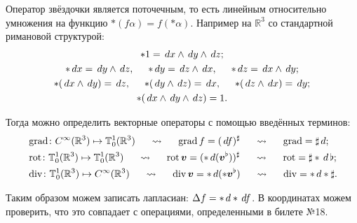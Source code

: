 Оператор звёздочки является поточечным, то есть линейным относительно умножения на функцию $*(f \alpha) = f(*\alpha)$. Например на $\mathbb{R}^3$ со стандартной римановой структурой:
\begin{gather*}
   	*1 = \, d x \wedge \, d y \wedge \, d z;
   	\\
   	*\, d x = \, d y \wedge \, d z, 
   	\hspace*{0.5 cm}
   	*\, d y = \, d z \wedge \, d x, 
   	\hspace*{0.5 cm}
   	*\, d z = \, d x \wedge \, d y;
   	\\
   	*(\, d x \wedge \, d y) = \, d z,
   	\hspace*{0.5 cm}
   	*(\, d y \wedge \, d z) = \, d x,
   	\hspace*{0.5 cm}
   	*(\, d z \wedge \, d x) = \, d y;
   	\\
   	*(\, d x \wedge \, d y \wedge \, d z) = 1.
\end{gather*}

Тогда можно определить векторные операторы с помощью введённых терминов:
\begin{align*}
   &\mathop{\mathrm{grad}}\nolimits \colon C^\infty(\mathbb{R}^3) \mapsto \mathbb{T}_0^1 (\mathbb{R}^3)
   \hspace*{0.5 cm} 
   \leadsto 
   \hspace*{0.5 cm}
   \mathop{\mathrm{grad}}\nolimits f = (\, d f)^\sharp 
   \hspace*{0.5 cm} 
   \leadsto 
   \hspace*{0.5 cm}
   \mathop{\mathrm{grad}}\nolimits = \sharp \, d;
   \\
   &\mathop{\mathrm{rot}}\nolimits \colon \mathbb{T}_0^1(\mathbb{R}^3) \mapsto \mathbb{T}_0^1(\mathbb{R}^3)
   \hspace*{0.5 cm} 
   \leadsto 
   \hspace*{0.5 cm}
   \mathop{\mathrm{rot}}\nolimits \mbox{\boldmath $v$} = (*\, d(\mbox{\boldmath $v$}^\flat))^\sharp
   \hspace*{0.5 cm} 
   \leadsto 
   \hspace*{0.5 cm}
   \mathop{\mathrm{rot}}\nolimits = \sharp * \, d \, \flat;
   \\
   &\mathop{\mathrm{div}}\nolimits \colon \mathbb{T}_0^1(\mathbb{R}^3) \mapsto C^\infty(\mathbb{R}^3)
   \hspace*{0.5 cm} 
   \leadsto 
   \hspace*{0.5 cm}
   \mathop{\mathrm{div}}\nolimits \mbox{\boldmath $v$} = *\, d(*\mbox{\boldmath $v$}^\flat)
   \hspace*{0.5 cm} 
   \leadsto 
   \hspace*{0.5 cm}
   \mathop{\mathrm{div}}\nolimits = * \, d * \sharp.
\end{align*}

Таким образом можем записать лапласиан: $\Delta f = *\, d * \, d f$. В координатах можем проверить, что это совпадает с операциями, определенными в билете №18.
